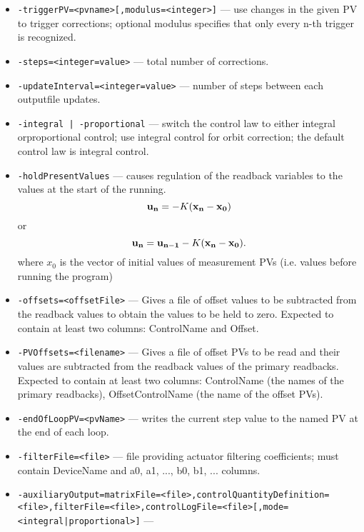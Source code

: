 \begin{itemize}
\begin{itemize}
        \item {\tt -triggerPV=<pvname>[,modulus=<integer>]} --- use changes in the given PV to trigger corrections; optional modulus specifies that only every n-th trigger is recognized.
        \item {\tt -steps=<integer=value>} ---  total number of corrections.
        \item {\tt -updateInterval=<integer=value>} --- number of steps between each outputfile updates.
        \item {\tt -integral | -proportional} --- 
               switch the control law to either integral orproportional
               control;  use integral control for orbit correction; 
               the default control law is integral control.
        \item {\tt -holdPresentValues} ---
               causes regulation of the readback variables to the
               values at the start of the running.
\begin{equation}
{\bf u_n} = - K ({\bf x_n} - {\bf x_0})
\end{equation}
or
\begin{equation}
{\bf u_n} = {\bf u_{n-1}} - K ({\bf x_n} - {\bf x_0}).
\end{equation}
where $x_0$ is the vector of initial values of measurement PVs (i.e. values before running the program)
        \item {\tt -offsets=<offsetFile>} --- Gives a file of offset values to be subtracted from the
               readback values to obtain the values to be held to zero.
               Expected to contain at least two columns: ControlName and Offset. 
        \item {\tt -PVOffsets=<filename>} --- Gives a file of offset PVs to be read and their values are 
               subtracted from the readback values of the primary readbacks.
               Expected to contain at least two columns: ControlName (the names
               of the primary readbacks), OffsetControlName (the name of
               the offset PVs).
        \item {\tt -endOfLoopPV=<pvName>} --- writes the current step value to the named PV at the end of each loop.
        \item {\tt -filterFile=<file>} --- file providing actuator filtering coefficients; must contain DeviceName and a0, a1, ..., b0, b1, ... columns.
        \item {\tt -auxiliaryOutput=matrixFile=<file>,controlQuantityDefinition=<file>,filterFile=<file>,controlLogFile=<file>[,mode=<integral|proportional>]} ---

\end{itemize}
\end{itemize}
